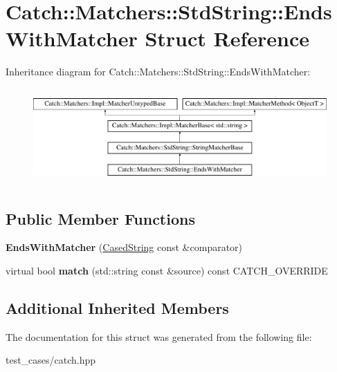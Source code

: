 \hypertarget{structCatch_1_1Matchers_1_1StdString_1_1EndsWithMatcher}{}\section{Catch\+:\+:Matchers\+:\+:Std\+String\+:\+:Ends\+With\+Matcher Struct Reference}
\label{structCatch_1_1Matchers_1_1StdString_1_1EndsWithMatcher}
Inheritance diagram for Catch\+:\+:Matchers\+:\+:Std\+String\+:\+:Ends\+With\+Matcher\+:\begin{figure}[H]
\begin{center}
\leavevmode
\includegraphics[height=3.696370cm]{structCatch_1_1Matchers_1_1StdString_1_1EndsWithMatcher}
\end{center}
\end{figure}
\subsection*{Public Member Functions}
\begin{DoxyCompactItemize}
\item 
\mbox{\label{structCatch_1_1Matchers_1_1StdString_1_1EndsWithMatcher_aa5ec700b4629562f74f362080accfd7b}} 
{\bfseries Ends\+With\+Matcher} (\hyperlink{structCatch_1_1Matchers_1_1StdString_1_1CasedString}{Cased\+String} const \&comparator)
\item 
\mbox{\label{structCatch_1_1Matchers_1_1StdString_1_1EndsWithMatcher_a21c6dc68e30716d5c718f4f8c3186af1}} 
virtual bool {\bfseries match} (std\+::string const \&source) const C\+A\+T\+C\+H\+\_\+\+O\+V\+E\+R\+R\+I\+DE
\end{DoxyCompactItemize}
\subsection*{Additional Inherited Members}


The documentation for this struct was generated from the following file\+:\begin{DoxyCompactItemize}
\item 
test\+\_\+cases/catch.\+hpp\end{DoxyCompactItemize}
